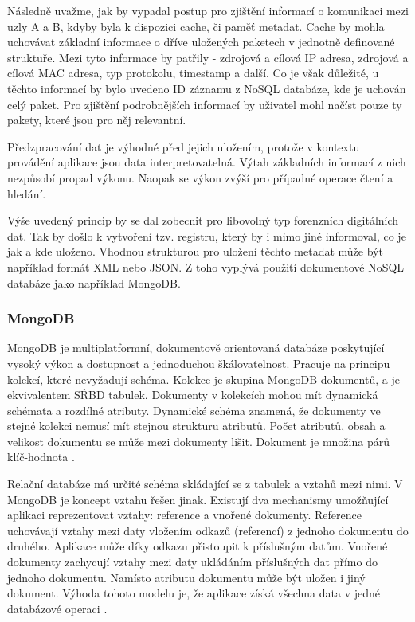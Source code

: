 Následně uvažme, jak by vypadal postup pro zjištění informací o komunikaci mezi uzly A a B, kdyby byla k dispozici cache, či paměť metadat. Cache by mohla uchovávat základní informace o dříve uložených paketech v jednotně definované struktuře. Mezi tyto informace by patřily - zdrojová a cílová IP adresa, zdrojová a cílová MAC adresa, typ protokolu, timestamp a další. Co je však důležité, u těchto informací by bylo uvedeno ID záznamu z NoSQL databáze, kde je uchován celý paket. Pro zjištění podrobnějších informací by uživatel mohl načíst pouze ty pakety, které jsou pro něj relevantní.

Předzpracování dat je výhodné před jejich uložením, protože v kontextu provádění aplikace jsou data interpretovatelná. Výtah základních informací z nich nezpůsobí propad výkonu. Naopak se výkon zvýší pro případné operace čtení a hledání.

Výše uvedený princip by se dal zobecnit pro libovolný typ forenzních digitálních dat. Tak by došlo k vytvoření tzv. registru, který by i mimo jiné informoval, co je jak a kde uloženo. Vhodnou strukturou pro uložení těchto metadat může být například formát XML nebo JSON. Z toho vyplývá použití dokumentové NoSQL databáze jako například MongoDB.

\subsubsection{MongoDB}
MongoDB je multiplatformní, dokumentově orientovaná databáze poskytující vysoký výkon a dostupnost a jednoduchou škálovatelnost. Pracuje na principu kolekcí, které nevyžadují schéma. Kolekce je skupina MongoDB dokumentů, a je ekvivalentem SŘBD tabulek. Dokumenty v kolekcích mohou mít dynamická schémata a rozdílné atributy. Dynamické schéma znamená, že dokumenty ve stejné kolekci nemusí mít stejnou strukturu atributů. Počet atributů, obsah a velikost dokumentu se může mezi dokumenty lišit. Dokument je množina párů klíč-hodnota \cite{mongoDBTutorialsPoint}.

Relační databáze má určité schéma skládající se z tabulek a vztahů mezi nimi. V MongoDB je koncept vztahu řešen jinak. Existují dva mechanismy umožňující aplikaci reprezentovat vztahy: reference a vnořené dokumenty. Reference uchovávají vztahy mezi daty vložením odkazů (referencí) z jednoho dokumentu do druhého. Aplikace může díky odkazu přistoupit k příslušným datům. Vnořené dokumenty zachycují vztahy mezi daty ukládáním příslušných dat přímo do jednoho dokumentu. Namísto atributu dokumentu může být uložen i jiný dokument. Výhoda tohoto modelu je, že aplikace získá všechna data v jedné databázové operaci \cite{mongoDBDataModelingIntro}.

